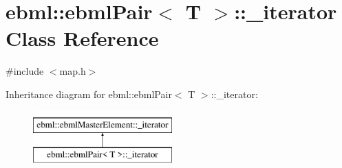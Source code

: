 \hypertarget{classebml_1_1ebmlPair_1_1__iterator}{}\section{ebml\+:\+:ebml\+Pair$<$ T $>$\+:\+:\+\_\+iterator Class Reference}
\label{classebml_1_1ebmlPair_1_1__iterator}


{\ttfamily \#include $<$map.\+h$>$}

Inheritance diagram for ebml\+:\+:ebml\+Pair$<$ T $>$\+:\+:\+\_\+iterator\+:\begin{figure}[H]
\begin{center}
\leavevmode
\includegraphics[height=2.000000cm]{classebml_1_1ebmlPair_1_1__iterator}
\end{center}
\end{figure}
